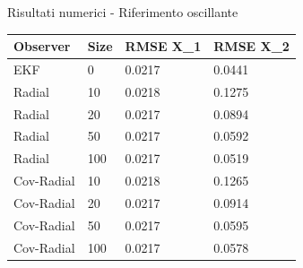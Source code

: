 \documentclass{beamer}
\begin{document}
\begin{frame}{Risultati numerici - Riferimento oscillante}
    \begin{table}[]
        \begin{tabular}{|llll|}
        \hline
        \textbf{Observer} & \textbf{Size} & \textbf{RMSE X\_1} & \textbf{RMSE X\_2} \\    \hline
        EKF         &   0   &   0.0217  &   0.0441  \\  \hline
        Radial      &   10  &   0.0218  &   0.1275  \\
        Radial      &   20  &   0.0217  &   0.0894  \\
        Radial      &   50  &   0.0217  &   0.0592  \\
        Radial      &   100 &   0.0217  &   0.0519  \\  \hline
        Cov-Radial  &   10  &   0.0218  &   0.1265  \\
        Cov-Radial  &   20  &   0.0217  &   0.0914  \\
        Cov-Radial  &   50  &   0.0217  &   0.0595  \\
        Cov-Radial  &   100 &   0.0217  &   0.0578  \\ \hline
        \end{tabular}
        \end{table}
\end{frame}
\end{document}
